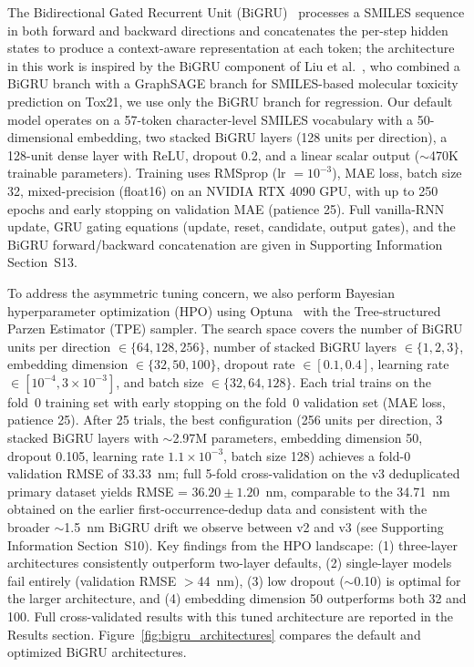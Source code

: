 \documentclass[journal=jcisd8,manuscript=article]{achemso}
\begin{document}
The Bidirectional Gated Recurrent Unit (BiGRU)~\cite{schuster1997bidirectional,cho2014learning} processes a SMILES sequence in both forward and backward directions and concatenates the per-step hidden states to produce a context-aware representation at each token; the architecture in this work is inspired by the BiGRU component of Liu et al.~\cite{liuPredictionMolecularToxicity2023}, who combined a BiGRU branch with a GraphSAGE branch for SMILES-based molecular toxicity prediction on Tox21, we use only the BiGRU branch for regression. Our default model operates on a 57-token character-level SMILES vocabulary with a 50-dimensional embedding, two stacked BiGRU layers (128 units per direction), a 128-unit dense layer with ReLU, dropout 0.2, and a linear scalar output ($\sim$470K trainable parameters). Training uses RMSprop (lr $= 10^{-3}$), MAE loss, batch size 32, mixed-precision (float16) on an NVIDIA RTX 4090 GPU, with up to 250 epochs and early stopping on validation MAE (patience 25). Full vanilla-RNN update, GRU gating equations (update, reset, candidate, output gates), and the BiGRU forward/backward concatenation are given in Supporting Information Section~S13.

To address the asymmetric tuning concern, we also perform Bayesian hyperparameter optimization (HPO) using Optuna~\cite{akiba2019optuna} with the Tree-structured Parzen Estimator (TPE) sampler.
The search space covers the number of BiGRU units per direction $\in \{64, 128, 256\}$, number of stacked BiGRU layers $\in \{1, 2, 3\}$, embedding dimension $\in \{32, 50, 100\}$, dropout rate $\in [0.1, 0.4]$, learning rate $\in [10^{-4}, 3 \times 10^{-3}]$, and batch size $\in \{32, 64, 128\}$.
Each trial trains on the fold~0 training set with early stopping on the fold~0 validation set (MAE loss, patience 25).
After 25 trials, the best configuration (256 units per direction, 3 stacked BiGRU layers with $\sim$2.97M parameters, embedding dimension 50, dropout 0.105, learning rate $1.1 \times 10^{-3}$, batch size 128) achieves a fold-0 validation RMSE of 33.33~nm; full 5-fold cross-validation on the v3 deduplicated primary dataset yields RMSE = $36.20 \pm 1.20$~nm, comparable to the 34.71~nm obtained on the earlier first-occurrence-dedup data and consistent with the broader $\sim$1.5~nm BiGRU drift we observe between v2 and v3 (see Supporting Information Section~S10).
Key findings from the HPO landscape: (1) three-layer architectures consistently outperform two-layer defaults, (2) single-layer models fail entirely (validation RMSE $>$44~nm), (3) low dropout ($\sim$0.10) is optimal for the larger architecture, and (4) embedding dimension 50 outperforms both 32 and 100.
Full cross-validated results with this tuned architecture are reported in the Results section.
Figure~\ref{fig:bigru_architectures} compares the default and optimized BiGRU architectures.
\end{document}
